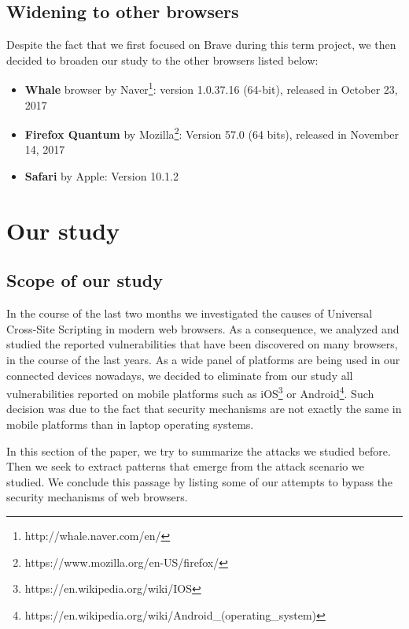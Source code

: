 \documentclass[journal]{IEEEtran}
\begin{document}
\subsection{Widening to other browsers}
\label{otherBrowsers}

Despite the fact that we first focused on Brave during this term project, we then decided to broaden our study to the other browsers listed below:

\begin{itemize}
\item \textbf{Whale} browser by Naver\footnote{http://whale.naver.com/en/}: version 1.0.37.16 (64-bit), released in October 23, 2017
\item \textbf{Firefox Quantum} by Mozilla\footnote{https://www.mozilla.org/en-US/firefox/}: Version 57.0 (64 bits), released in November 14, 2017
\item \textbf{Safari} by Apple: Version 10.1.2
\end{itemize}


\section{Our study}

\subsection{Scope of our study}

In the course of the last two months we investigated the causes of Universal Cross-Site Scripting in modern web browsers. As a consequence, we analyzed and studied the reported vulnerabilities that have been discovered on many browsers, in the course of the last years. 
As a wide panel of platforms are being used in our connected devices nowadays, we decided to eliminate from our study all vulnerabilities reported on mobile platforms such as iOS\footnote{https://en.wikipedia.org/wiki/IOS} or Android\footnote{https://en.wikipedia.org/wiki/Android\_(operating\_system)}. Such decision was due to the fact that security mechanisms are not exactly the same in mobile platforms than in laptop operating systems.

\medskip

In this section of the paper, we try to summarize the attacks we studied before. Then we seek to extract patterns that emerge from the attack scenario we studied. We conclude this passage by listing some of our attempts to bypass the security mechanisms of web browsers.
\end{document}
